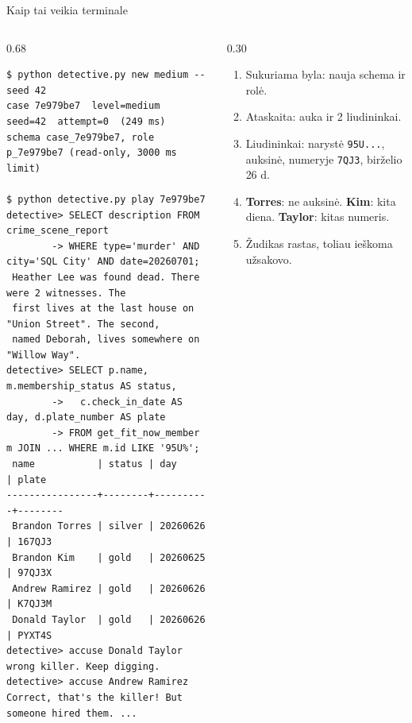 \documentclass[hyperref={breaklinks=true},fleqn,mathserif]{beamer}
\begin{document}
\begin{frame}[fragile]{Kaip tai veikia terminale}

\begin{columns}[T]
\begin{column}{0.68\textwidth}
\begin{lstlisting}[style=term]
$ python detective.py new medium --seed 42
case 7e979be7  level=medium  seed=42  attempt=0  (249 ms)
schema case_7e979be7, role p_7e979be7 (read-only, 3000 ms limit)

$ python detective.py play 7e979be7
detective> SELECT description FROM crime_scene_report
        -> WHERE type='murder' AND city='SQL City' AND date=20260701;
 Heather Lee was found dead. There were 2 witnesses. The
 first lives at the last house on "Union Street". The second,
 named Deborah, lives somewhere on "Willow Way".
detective> SELECT p.name, m.membership_status AS status,
        ->   c.check_in_date AS day, d.plate_number AS plate
        -> FROM get_fit_now_member m JOIN ... WHERE m.id LIKE '95U%';
 name           | status | day      | plate
----------------+--------+----------+--------
 Brandon Torres | silver | 20260626 | 167QJ3
 Brandon Kim    | gold   | 20260625 | 97QJ3X
 Andrew Ramirez | gold   | 20260626 | K7QJ3M
 Donald Taylor  | gold   | 20260626 | PYXT4S
detective> accuse Donald Taylor
wrong killer. Keep digging.
detective> accuse Andrew Ramirez
Correct, that's the killer! But someone hired them. ...
\end{lstlisting}
\end{column}

\begin{column}{0.30\textwidth}
\footnotesize
\begin{enumerate}
    \setlength{\itemsep}{2pt}
    \item Sukuriama byla: nauja schema ir rolė.
    \item Ataskaita: auka ir 2 liudininkai.
    \item Liudininkai: narystė \texttt{95U...}, auksinė, numeryje \texttt{7QJ3}, birželio 26 d.
    \item \textbf{Torres}: ne auksinė. \textbf{Kim}: kita diena. \textbf{Taylor}: kitas numeris.
    \item Žudikas rastas, toliau ieškoma užsakovo.
\end{enumerate}
\end{column}
\end{columns}

\end{frame}
\end{document}
